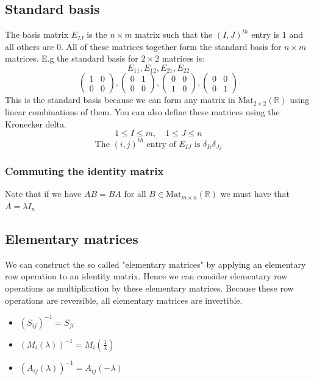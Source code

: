 \documentclass[12pt]{article}
\newcommand{\mat}[3]{\text{Mat}_{#1\times#2}(\mathbb{#3})}
\begin{document}
\subsection*{Standard basis}
The basis matrix \(E_{IJ}\) is the \(n\times m\) matrix such that the \((I,J)^{th}\) entry is 1 and all others are 0. All of these matrices together form the standard basis for \(n\times m\) matrices. E.g the standard basis for \(2\times2\) matrices is:
\[E_{11},E_{12},E_{21},E_{22}\]
\[\begin{pmatrix}
    1 & 0 \\
    0 & 0
\end{pmatrix},\begin{pmatrix}
    0 & 1 \\
    0 & 0 
\end{pmatrix},\begin{pmatrix}
    0 & 0 \\
    1 & 0
\end{pmatrix},\begin{pmatrix}
    0 & 0 \\
    0 & 1
\end{pmatrix}\]
This is the standard basis because we can form any matrix in \(\mat{2}{2}{R}\) using linear combinations of them. You can also define these matrices using the Kronecker delta.
\[1\leq I\leq m,\quad1\leq J\leq n\]
\[\text{The }(i,j)^{th} \text{ entry of } E_{IJ} \text{ is }\delta_{Ii}\delta_{Jj}\]
\subsubsection*{Commuting the identity matrix}
Note that if we have \(AB=BA\) for all \(B\in\mat{m}{n}{R}\) we must have that \(A=\lambda I_n\)
\subsection*{Elementary matrices}
We can construct the so called "elementary matrices" by applying an elementary row operation to an identity matrix. Hence we can consider elementary row operations as multiplication by these elementary matrices. Because these row operations are reversible, all elementary matrices are invertible.
\begin{itemize}
    \item \((S_{ij})^{-1}=S_{ji}\)
    \item \((M_i(\lambda))^{-1}=M_i(\frac{1}{\lambda})\)
    \item \((A_{ij}(\lambda))^{-1}=A_{ij}(-\lambda)\)
\end{itemize}
\end{document}
